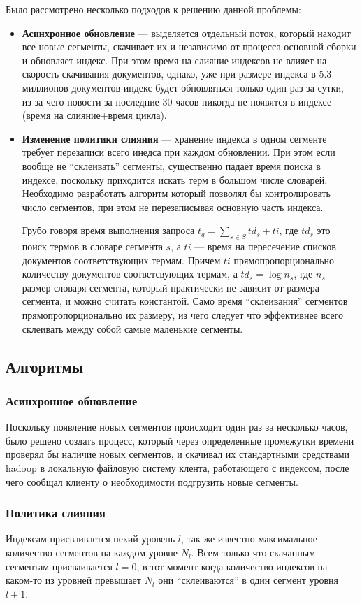 Было рассмотрено несколько подходов к решению данной проблемы:
\begin{itemize}
 \item \textbf{Асинхронное обновление} --- выделяется отдельный поток, который  находит все новые сегменты, скачивает их и независимо от процесса основной сборки и обновляет индекс. При этом время на слияние индексов не влияет на скорость скачивания документов, однако, уже при размере индекса в 5.3 миллионов документов индекс будет обновляться только один раз за сутки, из-за чего новости за последние 30 часов никогда не появятся в индексе (время на слияние+время цикла).
 \item \textbf{Изменение политики слияния} --- хранение индекса в одном сегменте требует перезаписи всего инедса при каждом обновлении. При этом если вообще не ``склеивать'' сегменты, существенно падает время поиска в индексе, поскольку приходится искать терм в большом числе словарей. Необходимо разработать алгоритм который позволял бы контролировать число сегментов, при этом не перезаписывая основную часть индекса.

Грубо говоря время выполнения запроса $t_{q} = \sum\limits_{s\in S} td_{s} + ti$, где $td_{s}$ это поиск термов в словаре сегмента $s$, а $ti$ --- время на пересечение списков документов соответствующих термам. Причем $ti$ прямопропорционально количеству документов соответсвующих термам, а $td_{s} = \log n_{s}$, где $n_{s}$ --- размер словаря сегмента, который практически не зависит от размера сегмента, и можно считать константой. Само время ``склеивания'' сегментов прямопропорционально их размеру, из чего следует что эффективнее всего склеивать между собой самые маленькие сегменты. 
 
\end{itemize}
\subsection{Алгоритмы}
\subsubsection{Асинхронное обновление}
Поскольку появление новых сегментов происходит один раз за несколько часов, было решено создать процесс, который через определенные промежутки времени проверял бы наличие новых сегментов, и скачивал их стандартными средствами hadoop в локальную файловую систему клента, работающего с индексом, после чего сообщал клиенту о необходимости подгрузить новые сегменты.
\subsubsection{Политика слияния}
Индексам присваивается некий уровень $l$, так же известно максимальное количество сегментов на каждом уровне $N_{l}$. Всем только что скачанным сегментам присваивается $l=0$, в тот момент когда количество индексов на каком-то из уровней превышает $N_{l}$ они ``склеиваются'' в один сегмент уровня $l+1$.
